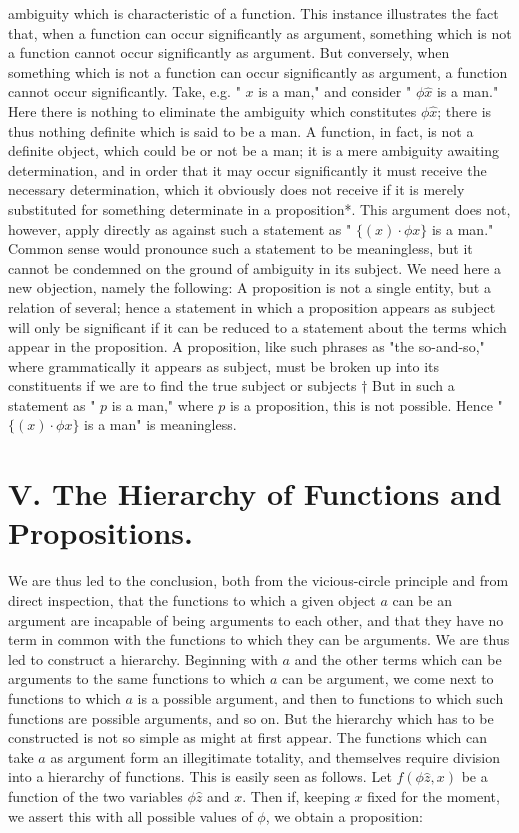 \documentclass[10pt]{article}
\begin{document}
ambiguity which is characteristic of a function. This instance illustrates the fact that, when a function can occur significantly as argument, something which is not a function cannot occur significantly as argument. But conversely, when something which is not a function can occur significantly as argument, a function cannot occur significantly. Take, e.g. " $x$ is a man," and consider " $\phi \hat{x}$ is a man." Here there is nothing to eliminate the ambiguity which constitutes $\phi \hat{x}$; there is thus nothing definite which is said to be a man. A function, in fact, is not a definite object, which could be or not be a man; it is a mere ambiguity awaiting determination, and in order that it may occur significantly it must receive the necessary determination, which it obviously does not receive if it is merely substituted for something determinate in a proposition*. This argument does not, however, apply directly as against such a statement as " $\{(x) \cdot \phi x\}$ is a man." Common sense would pronounce such a statement to be meaningless, but it cannot be condemned on the ground of ambiguity in its subject. We need here a new objection, namely the following: A proposition is not a single entity, but a relation of several; hence a statement in which a proposition appears as subject will only be significant if it can be reduced to a statement about the terms which appear in the proposition. A proposition, like such phrases as "the so-and-so," where grammatically it appears as subject, must be broken up into its constituents if we are to find the true subject or subjects † But in such a statement as " $p$ is a man," where $p$ is a proposition, this is not possible. Hence " $\{(x) \cdot \phi x\}$ is a man" is meaningless.

\section*{V. The Hierarchy of Functions and Propositions.}
We are thus led to the conclusion, both from the vicious-circle principle and from direct inspection, that the functions to which a given object $a$ can be an argument are incapable of being arguments to each other, and that they have no term in common with the functions to which they can be arguments. We are thus led to construct a hierarchy. Beginning with $a$ and the other terms which can be arguments to the same functions to which $a$ can be argument, we come next to functions to which $a$ is a possible argument, and then to functions to which such functions are possible arguments, and so on. But the hierarchy which has to be constructed is not so simple as might at first appear. The functions which can take $a$ as argument form an illegitimate totality, and themselves require division into a hierarchy of functions. This is easily seen as follows. Let $f(\phi \hat{z}, x)$ be a function of the two variables $\phi \hat{z}$ and $x$. Then if, keeping $x$ fixed for the moment, we assert this with all possible values of $\phi$, we obtain a proposition:
\end{document}
